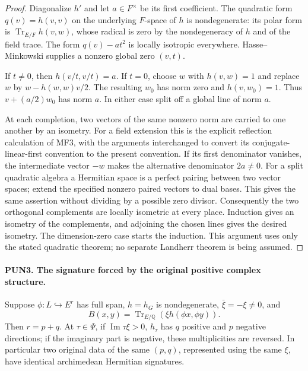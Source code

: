 \begin{proof}
Diagonalize \(h'\) and let \(a\in F^\times\) be its first
coefficient.  The quadratic form \(q(v)=h(v,v)\) on the underlying
\(F\)-space of \(h\) is nondegenerate: its polar form is
\(\operatorname{Tr}_{E/F}h(v,w)\), whose radical is zero by the
nondegeneracy of \(h\) and of the field trace.  The form
\(q(v)-a t^2\) is locally isotropic everywhere.  Hasse--Minkowski
supplies a nonzero global zero \((v,t)\).

If \(t\ne0\), then \(h(v/t,v/t)=a\).  If \(t=0\), choose
\(w\) with \(h(v,w)=1\) and replace \(w\) by
\(w-h(w,w)v/2\).  The resulting \(w_0\) has norm zero and
\(h(v,w_0)=1\).  Thus \(v+(a/2)w_0\) has norm \(a\).
In either case split off a global line of norm \(a\).

At each completion, two vectors of the same nonzero norm are
carried to one another by an isometry.  For a field extension this
is the explicit reflection calculation of MF3, with the arguments
interchanged to convert its conjugate-linear-first convention to
the present convention.  If its first denominator vanishes, the
intermediate vector \(-w\) makes the alternative denominator
\(2a\ne0\).  For a split quadratic algebra a Hermitian space is
a perfect pairing between two vector spaces; extend the specified
nonzero paired vectors to dual bases.  This gives the same assertion
without dividing by a possible zero divisor.  Consequently the two
orthogonal complements are locally isometric at every place.
Induction gives an isometry of the complements, and adjoining the
chosen lines gives the desired isometry.  The dimension-zero case
starts the induction.  This argument uses only the stated quadratic
theorem; no separate Landherr theorem is being assumed.
\end{proof}

\paragraph{PUN3. The signature forced by the original positive complex structure.}
\label{claim:PUN3}
Suppose \(\phi:L\hookrightarrow E^r\) has full span, \(h=h_G\)
is nondegenerate, \(\bar\xi=-\xi\ne0\), and
\[
              B(x,y)=\operatorname{Tr}_{E/\mathbb Q}
                              (\xi h(\phi x,\phi y)).
 \tag{PUN.4}
\]
Then \(r=p+q\).  At \(\tau\in\Psi\), if
\(\operatorname{Im}\tau\xi>0\), \(h_\tau\) has \(q\)
positive and \(p\) negative directions; if the imaginary part is
negative, these multiplicities are reversed.  In particular two
original data of the same \((p,q)\), represented using the same
\(\xi\), have identical archimedean Hermitian signatures.

